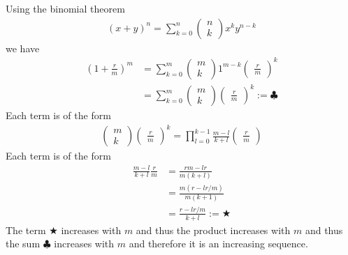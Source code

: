 \documentclass{article}
\theoremstyle{definition}
\numberwithin{equation}{section}
\begin{document}
Using the binomial theorem
\begin{align*}
    (x+y)^n = \sum_{k=0}^n \begin{pmatrix} n \\ k \end{pmatrix} x^k y^{n-k}
\end{align*}
we have 
\begin{align*}
    \left( 1 + \frac{r}{m} \right)^m &= \sum_{k=0}^m \begin{pmatrix} m \\ k \end{pmatrix} 1^{m-k}\begin{pmatrix} \frac{r}{m} \end{pmatrix}^k\\
    &= \sum_{k=0}^m \begin{pmatrix} m \\ k \end{pmatrix} \begin{pmatrix} \frac{r}{m} \end{pmatrix}^k := \clubsuit
\end{align*}
Each term is of the form
\begin{align*}
    \begin{pmatrix} m \\ k \end{pmatrix}\begin{pmatrix} \frac{r}{m} \end{pmatrix}^k = \prod_{l=0}^{k-1} \frac{m-l}{k + l} \begin{pmatrix} \frac{r}{m} \end{pmatrix}
\end{align*}
Each term is of the form
\begin{align*}
    \frac{m-l}{k+l} \frac{r}{m} &= \frac{rm - lr}{m(k+l)}\\
    &= \frac{m(r - lr/m)}{m(k+1)}\\
    &= \frac{r - lr/m}{k+l} := \bigstar
\end{align*}
The term $\bigstar$ increases with $m$ and thus the product increases with $m$ and thus the sum $\clubsuit$ increases with $m$ and therefore it is an increasing sequence. 
\end{document}
